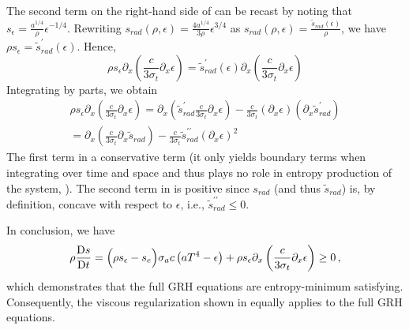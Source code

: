 \documentclass[review]{elsarticle}
\begin{document}
The second term on the right-hand side of  can be recast by noting that $s_\epsilon = \frac{a^{1/4}}{\rho} \epsilon^{-1/4}$. Rewriting $s_{rad}(\rho, \epsilon) = \frac{4a^{1/4}}{3\rho} \epsilon^{3/4}$ as  $s_{rad}(\rho, \epsilon) = \frac{\tilde{s}_{rad}(\epsilon)}{\rho}$, we have
$ \rho s_\epsilon = \tilde{s}^\prime_{rad}(\epsilon)$. Hence, 
\begin{equation}
\rho s_\epsilon \partial_x \left( \frac{c}{3 \sigma_t} \partial_x \epsilon \right) 
=
 \tilde{s}^\prime_{rad}(\epsilon) \partial_x \left( \frac{c}{3 \sigma_t} \partial_x \epsilon \right) 
\end{equation}
%
Integrating by parts, we obtain
%
\begin{multline} \label{eq:final_form_second_term}
\rho s_\epsilon \partial_x \left( \frac{c}{3 \sigma_t} \partial_x \epsilon \right) 
=
 \partial_x \left(  \tilde{s}^\prime_{rad}  \frac{c}{3 \sigma_t} \partial_x \epsilon \right) 
-
\frac{c}{3 \sigma_t} \left(  \partial_x \epsilon \right)  \left( \partial_x \tilde{s}^\prime_{rad}  \right) \\
=
 \partial_x \left(   \frac{c}{3 \sigma_t} \partial_x \tilde{s}_{rad}  \right) 
-
\frac{c}{3 \sigma_t} \tilde{s}^{\prime\prime}_{rad}  \left(  \partial_x \epsilon \right)^2   \qquad  \qquad  \qquad \ 
\end{multline}
%
The first term in  a conservative term (it only yields boundary terms when integrating over time and space and thus plays no role in entropy production of the system, \cite{Leveque}). The second term  in  is positive 
since $s_{rad}$ (and thus $\tilde{s}_{rad}$) is, by definition, concave with respect to $\epsilon$, i.e., $\tilde{s}^{\prime\prime}_{rad} \leq 0$.

In conclusion, we have 
\begin{equation} 
\rho \frac{\textrm{D} s}{\textrm{D} t} = \Big( \rho s_\epsilon -s_e \Big)  \sigma_a c \left( a T^4 - \epsilon \right) +   \rho s_\epsilon \partial_x \left( \frac{c}{3 \sigma_t} \partial_x \epsilon \right) \geq 0 \,,
\end{equation}
which demonstrates that the full GRH equations are entropy-minimum satisfying. Consequently, the viscous regularization shown in  equally applies to the full GRH equations. 
%
\end{document}

